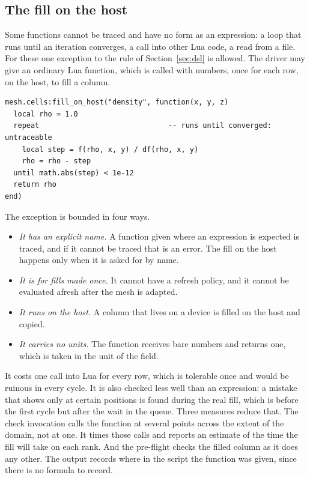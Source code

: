 \documentclass[11pt,a4paper]{article}
\begin{document}
\subsection{The fill on the host}

Some functions cannot be traced and have no form as an expression: a loop
that runs until an iteration converges, a call into other Lua code, a read
from a file.  For these one exception to the rule of Section~\ref{sec:dsl}
is allowed.  The driver may give an ordinary Lua function, which is called
with numbers, once for each row, on the host, to fill a column.

\begin{lstlisting}[language={[5.3]Lua}]
mesh.cells:fill_on_host("density", function(x, y, z)
  local rho = 1.0
  repeat                              -- runs until converged: untraceable
    local step = f(rho, x, y) / df(rho, x, y)
    rho = rho - step
  until math.abs(step) < 1e-12
  return rho
end)
\end{lstlisting}

The exception is bounded in four ways.

\begin{itemize}
  \item \emph{It has an explicit name.}  A function given where an
        expression is expected is traced, and if it cannot be traced that
        is an error.  The fill on the host happens only when it is asked
        for by name.
  \item \emph{It is for fills made once.}  It cannot have a refresh policy,
        and it cannot be evaluated afresh after the mesh is adapted.
  \item \emph{It runs on the host.}  A column that lives on a device is
        filled on the host and copied.
  \item \emph{It carries no units.}  The function receives bare numbers and
        returns one, which is taken in the unit of the field.
\end{itemize}

It costs one call into Lua for every row, which is tolerable once and would
be ruinous in every cycle.  It is also checked less well than an
expression: a mistake that shows only at certain positions is found during
the real fill, which is before the first cycle but after the wait in the
queue.  Three measures reduce that.  The check invocation calls the
function at several points across the extent of the domain, not at one.  It
times those calls and reports an estimate of the time the fill will take on
each rank.  And the pre-flight checks the filled column as it does any
other.  The output records where in the script the function was given,
since there is no formula to record.
\end{document}
